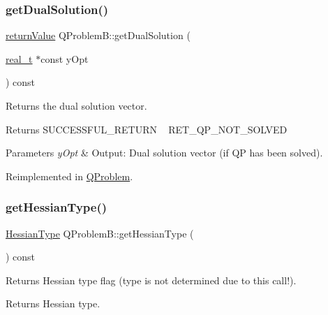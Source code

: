 \subsubsection{\texorpdfstring{get\+Dual\+Solution()}{getDualSolution()}}
{\footnotesize\ttfamily \hyperlink{_message_handling_8hpp_a81d556f613bfbabd0b1f9488c0fa865e}{return\+Value} Q\+Problem\+B\+::get\+Dual\+Solution (\begin{DoxyParamCaption}\item[{\hyperlink{qp_o_a_s_e_s__wrapper_8h_a0d00e2b3dfadee81331bbb39068570c4}{real\+\_\+t} $\ast$const}]{y\+Opt }\end{DoxyParamCaption}) const\hspace{0.3cm}{\ttfamily [virtual]}}

Returns the dual solution vector. \begin{DoxyReturn}{Returns}
S\+U\+C\+C\+E\+S\+S\+F\+U\+L\+\_\+\+R\+E\+T\+U\+RN ~\newline
 R\+E\+T\+\_\+\+Q\+P\+\_\+\+N\+O\+T\+\_\+\+S\+O\+L\+V\+ED 
\end{DoxyReturn}

\begin{DoxyParams}{Parameters}
{\em y\+Opt} & Output\+: Dual solution vector (if QP has been solved). \\
\hline
\end{DoxyParams}


Reimplemented in \hyperlink{class_q_problem_ae58420046e14b4b252c6833e2bd09b09}{Q\+Problem}.

\mbox{\label{class_q_problem_b_a4658fef144420003235925f5a4683217}} 
\subsubsection{\texorpdfstring{get\+Hessian\+Type()}{getHessianType()}}
{\footnotesize\ttfamily \hyperlink{_types_8hpp_a604cad5cda14e378ce4a77ab28ee9fd9}{Hessian\+Type} Q\+Problem\+B\+::get\+Hessian\+Type (\begin{DoxyParamCaption}{ }\end{DoxyParamCaption}) const\hspace{0.3cm}{\ttfamily [inline]}}

Returns Hessian type flag (type is not determined due to this call!). \begin{DoxyReturn}{Returns}
Hessian type. 
\end{DoxyReturn}
\mbox{\label{class_q_problem_b_a9111a3b8cdebcec73cdec7a446c52457}} 
